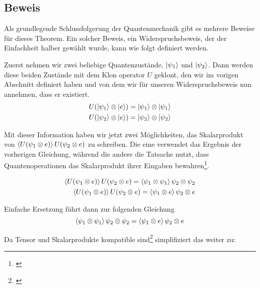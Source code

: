 \subsection{Beweis}\label{subsec:proof}
Als grundlegende Schlussfolgerung der Quantenmechanik gibt es mehrere Beweise für dieses Theorem.
Ein solcher Beweis, ein Widerspruchsbeweis, der der Einfachheit halber gewählt wurde, kann wie folgt definiert werden.

Zuerst nehmen wir zwei beliebige Quantenzustände, $\ket{\psi_1}$ und $\ket{\psi_2}$.
Dann werden diese beiden Zustände mit dem Klon operator $U$ geklont, den wir im vorigen Abschnitt definiert haben
und von dem wir für unseren Widerspruchsbeweis nun annehmen, dass er existiert.
\begin{equation}
\begin{split}
    U(\ket{\psi_1} \otimes \ket{e}) = \ket{\psi_1} \otimes \ket{\psi_1}\\
    U(\ket{\psi_2} \otimes \ket{e}) = \ket{\psi_2} \otimes \ket{\psi_2}
\end{split}\label{eq:clone_two_states}
\end{equation}

Mit dieser Information haben wir jetzt zwei Möglichkeiten, das Skalarprodukt von
$\braket{U(\psi_1 \otimes e)}{U(\psi_2 \otimes e)}$ zu schreiben.
Die eine verwendet das Ergebnis der vorherigen Gleichung, während die andere die Tatsache nutzt,
dass Quantenoperationen das Skalarprodukt ihrer Eingaben bewahren\footnote{\cite{segal_postulates_1947}}.

\begin{equation}
\begin{split}
    \braket{U(\psi_1 \otimes e)}{U(\psi_2 \otimes e)} = \braket{\psi_1 \otimes \psi_1}{\psi_2 \otimes \psi_2}\\
    \braket{U(\psi_1 \otimes e)}{U(\psi_2 \otimes e)} = \braket{\psi_1 \otimes e}{\psi_2 \otimes e}
\end{split}\label{eq:two_scalar_products}
\end{equation}

Einfache Ersetzung führt dann zur folgenden Gleichung
\begin{equation}
    \braket{\psi_1 \otimes \psi_1}{\psi_2 \otimes \psi_2} =
    \braket{\psi_1 \otimes e}{\psi_2 \otimes e}
\label{eq:tensor_equals}
\end{equation}

Da Tensor und Skalarprodukte kompatible sind\footnote{\cite{segal_postulates_1947}} simplifiziert das weiter zu:


